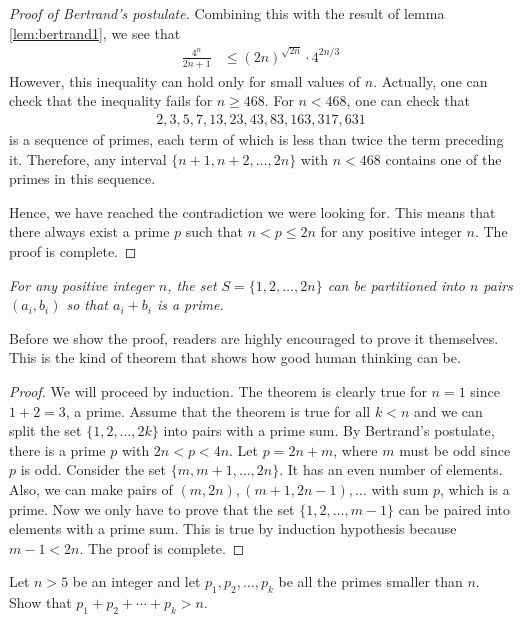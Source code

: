 \documentclass{subfile}
\begin{document}
\begin{proof}[Proof of Bertrand's postulate]
		Combining this with the result of lemma \autoref{lem:bertrand1}, we see that
		\begin{align*}
			\frac{4^n}{2n+1}
				& \leq (2n)^{\sqrt{2n}} \cdot 4^{2n/3}
		\end{align*}
		However, this inequality can hold only for small values of $n$. Actually, one can check that the inequality fails for $n \geq 468$. For $n < 468$, one can check that
		\begin{align*}
		2, 3, 5, 7, 13, 23, 43, 83, 163, 317, 631
		\end{align*}
		is a sequence of primes, each term of which is less than twice the term preceding it. Therefore, any interval $\{n+1, n+2, \ldots, 2n\}$ with $n<468$ contains one of the primes in this sequence.

		Hence, we have reached the contradiction we were looking for. This means that there always exist a prime $p$ such that $n<p\leq 2n$ for any positive integer $n$. The proof is complete.
	\end{proof}


	\begin{theorem}\slshape
		For any positive integer $n$, the set $S=\{1,2,\ldots,2n\}$ can be partitioned into $n$ pairs $(a_i,b_i)$ so that $a_i+b_i$ is a prime.
	\end{theorem}

	Before we show the proof, readers are highly encouraged to prove it themselves. This is the kind of theorem that shows how good human thinking can be.

	\begin{proof}
		We will proceed by induction. The theorem is clearly true for $n=1$ since $1+2=3$, a prime. Assume that the theorem is true for all $k<n$ and we can split the set $\{1,2,\ldots,2k\}$ into pairs with a prime sum. By Bertrand's postulate, there is a prime $p$ with $2n<p<4n$. Let $p=2n+m$, where $m$ must be odd since $p$ is odd. Consider the set $\{m,m+1, \ldots , 2n\}$. It has an even number of elements. Also, we can make pairs of $(m,2n), (m+1,2n-1), \ldots$ with sum $p$, which is a prime. Now we only have to prove that the set $\{1,2,\ldots,m-1\}$ can be paired into elements with a prime sum. This is true by induction hypothesis because $m-1<2n$. The proof is complete.
	\end{proof}

	\begin{problem}
		Let $n > 5$ be an integer and let $p_1, p_2, \ldots, p_k$ be all the primes smaller than $n$. Show that $p_1 + p_2 + \cdots + p_k >n$.
	\end{problem}
\end{document}
